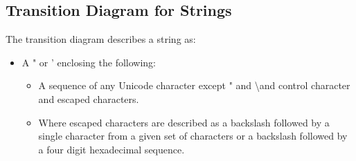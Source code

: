 \documentclass[12pt]{article}
\begin{document}
\subsection{Transition Diagram for Strings}
The transition diagram describes a string as:
\begin{itemize}
\item A " or ' enclosing the following:
\begin{itemize}
\item A sequence of any Unicode character except " and \textbackslash \space and control character and escaped characters.
\item Where escaped characters are described as a backslash followed by a single character from a given set of characters or a backslash followed by a four digit hexadecimal sequence.
\end{itemize}
\end{itemize}
\end{document}
